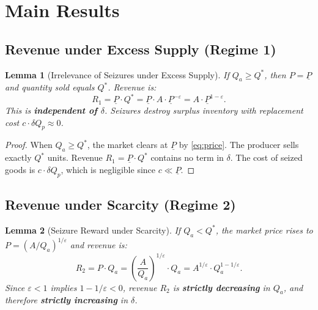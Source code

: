 \documentclass[12pt, a4paper]{article}
\newtheorem{lemma}{Lemma}
\begin{document}
\section{Main Results}

\subsection{Revenue under Excess Supply (Regime 1)}

\begin{lemma}[Irrelevance of Seizures under Excess Supply]
\label{lem:regime1}
If $Q_a \geq Q^*$, then $P = \underline{P}$ and quantity sold equals $Q^*$. Revenue is:
\begin{equation}
R_1 = \underline{P} \cdot Q^* = \underline{P} \cdot A \cdot \underline{P}^{-\varepsilon} = A \cdot \underline{P}^{1-\varepsilon}.
\end{equation}
This is \textbf{independent of $\delta$}. Seizures destroy surplus inventory with replacement cost $c \cdot \delta Q_p \approx 0$.
\end{lemma}

\begin{proof}
When $Q_a \geq Q^*$, the market clears at $\underline{P}$ by \eqref{eq:price}. The producer sells exactly $Q^*$ units. Revenue $R_1 = \underline{P} \cdot Q^*$ contains no term in $\delta$. The cost of seized goods is $c \cdot \delta Q_p$, which is negligible since $c \ll \underline{P}$.
\end{proof}

\subsection{Revenue under Scarcity (Regime 2)}

\begin{lemma}[Seizure Reward under Scarcity]
\label{lem:regime2}
If $Q_a < Q^*$, the market price rises to $P = (A/Q_a)^{1/\varepsilon}$ and revenue is:
\begin{equation}
R_2 = P \cdot Q_a = \left(\frac{A}{Q_a}\right)^{1/\varepsilon} \cdot Q_a = A^{1/\varepsilon} \cdot Q_a^{1 - 1/\varepsilon}.
\end{equation}
Since $\varepsilon < 1$ implies $1 - 1/\varepsilon < 0$, revenue $R_2$ is \textbf{strictly decreasing} in $Q_a$, and therefore \textbf{strictly increasing} in $\delta$.
\end{lemma}
\end{document}
